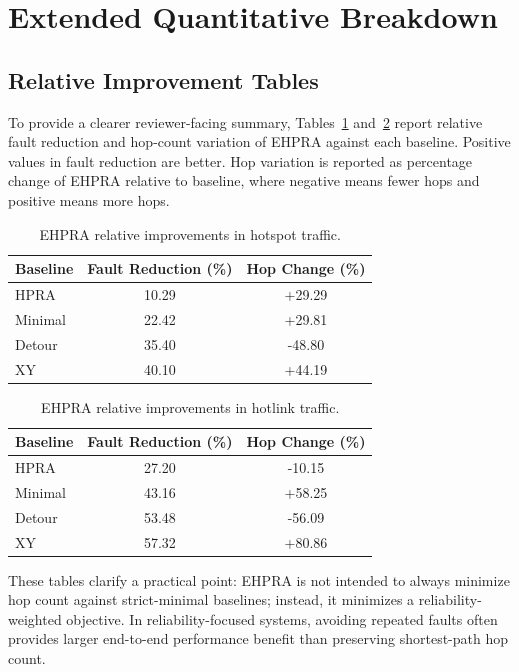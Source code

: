 \documentclass[10pt,a4paper]{article}
\begin{document}
\section{Extended Quantitative Breakdown}
\subsection{Relative Improvement Tables}
To provide a clearer reviewer-facing summary, Tables~\ref{tab:hotspot_imp} and~\ref{tab:hotlink_imp} report relative fault reduction and hop-count variation of EHPRA against each baseline. Positive values in fault reduction are better. Hop variation is reported as percentage change of EHPRA relative to baseline, where negative means fewer hops and positive means more hops.

\begin{table}[H]
\centering
\caption{EHPRA relative improvements in hotspot traffic.}
\label{tab:hotspot_imp}
\begin{tabular}{lcc}
\toprule
Baseline & Fault Reduction (\%) & Hop Change (\%) \\
\midrule
HPRA & 10.29 & +29.29 \\
Minimal & 22.42 & +29.81 \\
Detour & 35.40 & -48.80 \\
XY & 40.10 & +44.19 \\
\bottomrule
\end{tabular}
\end{table}

\begin{table}[H]
\centering
\caption{EHPRA relative improvements in hotlink traffic.}
\label{tab:hotlink_imp}
\begin{tabular}{lcc}
\toprule
Baseline & Fault Reduction (\%) & Hop Change (\%) \\
\midrule
HPRA & 27.20 & -10.15 \\
Minimal & 43.16 & +58.25 \\
Detour & 53.48 & -56.09 \\
XY & 57.32 & +80.86 \\
\bottomrule
\end{tabular}
\end{table}

These tables clarify a practical point: EHPRA is not intended to always minimize hop count against strict-minimal baselines; instead, it minimizes a reliability-weighted objective. In reliability-focused systems, avoiding repeated faults often provides larger end-to-end performance benefit than preserving shortest-path hop count.
\end{document}
